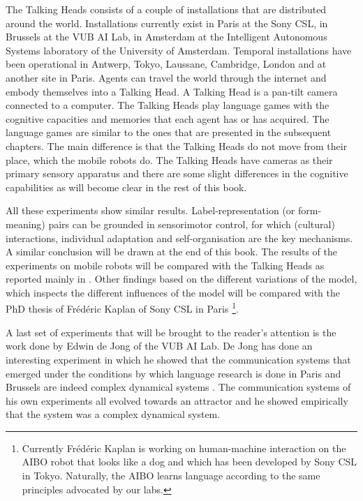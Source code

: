 The Talking Heads consists of a couple of installations that are distributed around the world. Installations currently exist in Paris at the Sony CSL, in Brussels at the VUB AI Lab, in Amsterdam at the Intelligent Autonomous Systems laboratory of the University of Amsterdam. Temporal installations have been operational in Antwerp, Tokyo, Laussane, Cambridge, London and at another site in Paris. Agents can travel the world through the internet and embody themselves into a Talking Head. A Talking Head is a pan-tilt camera connected to a computer. The Talking Heads play language games with the cognitive capacities and memories that each agent has or has acquired. The language games are similar to the ones that are presented in the subsequent chapters. The main difference is that the Talking Heads do not move from their place, which the mobile robots do. The Talking Heads have cameras as their primary sensory apparatus and there are some slight differences in the cognitive capabilities as will become clear in the rest of this book.



All these experiments show similar results. Label-representation (or form-meaning) pairs can be grounded in sensorimotor control, for which (cultural) interactions, individual adaptation and self-organisation are the key mechanisms. A similar conclusion will be drawn at the end of this book. The results of the experiments on mobile robots will be compared with the Talking Heads as reported mainly in \citep{steels:2000}. Other findings based on the different variations of the model, which inspects the different influences of the model will be compared with the PhD thesis of Fr\'ed\'eric Kaplan of Sony CSL in Paris \citep{kaplan:2000}\footnote{Currently Fr\'ed\'eric Kaplan is working on human-machine interaction on the AIBO robot that looks like a dog and which has been developed by Sony CSL in Tokyo. Naturally, the AIBO learns language according to the same principles advocated by our labs.}.


A last set of experiments that will be brought to the reader's attention is the work done by Edwin de Jong of the VUB AI Lab. De Jong has done an interesting experiment in which he showed that the communication systems that emerged under the conditions by which language research is done in Paris and Brussels are indeed complex dynamical systems \citep{dejong:2000}. The communication systems of his own experiments all evolved towards an attractor and he showed empirically that the system was a complex dynamical system.


